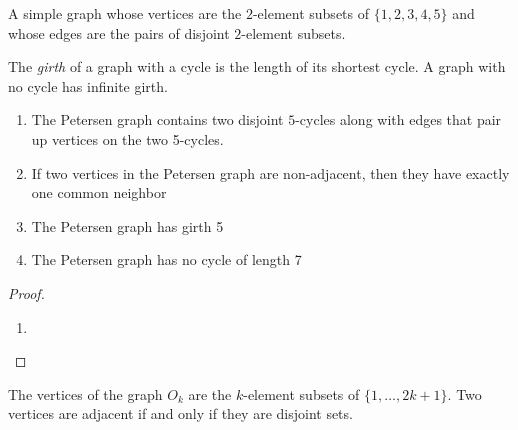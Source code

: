 \begin{definition}
    A simple graph whose vertices are the $2$-element subsets of $\{1,2,3,4,5\}$ and whose edges are the pairs of disjoint $2$-element subsets.
\end{definition}

\begin{definition}[Girth]
    The \textit{girth} of a graph with a cycle is the length of its shortest cycle. A graph with no cycle has infinite girth.
\end{definition}

\begin{proposition}
    \hfill 
    \begin{enumerate}
        \item The Petersen graph contains two disjoint $5$-cycles along with edges that pair up vertices on the two 5-cycles.
        \item If two vertices in the Petersen graph are non-adjacent, then they have exactly one common neighbor 
        \item The Petersen graph has girth 5
        \item The Petersen graph has no cycle of length 7
    \end{enumerate}
\end{proposition}
\begin{proof}
    \hfill 
    \begin{enumerate}
        \item 
    \end{enumerate}
\end{proof}

\begin{definition}
    The vertices of the graph $O_k$ are the $k$-element subsets of $\{1,\ldots,2k + 1\}$. Two vertices are adjacent if and only if they are disjoint sets.
\end{definition}

